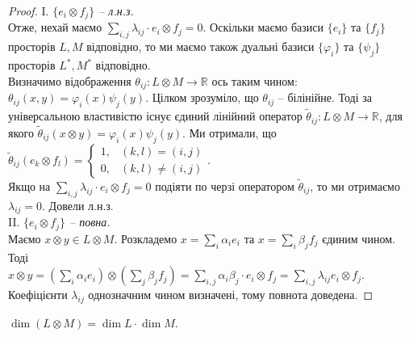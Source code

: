 \documentclass{math_library}
\begin{document}
\begin{proof}
I. \textit{$\{e_i \otimes f_j\}$ -- л.н.з.}\\
Отже, нехай маємо $\displaystyle\sum_{i,j} \lambda_{ij} \cdot e_i \otimes f_j = 0$. Оскільки маємо базиси $\{e_i\}$ та $\{f_j\}$ просторів $L,M$ відповідно, то ми маємо також дуальні базиси $\{\varphi_i\}$ та $\{\psi_j\}$ просторів $L^*,M^*$ відповідно.\\
Визначимо відображення $\theta_{ij} \colon L \otimes M \to \mathbb{R}$ ось таким чином: $\theta_{ij}(x,y) = \varphi_i(x) \psi_j(y)$. Цілком зрозуміло, що $\theta_{ij}$ -- білінійне. Тоді за універсальною властивістю існує єдиний лінійний оператор $\tilde{\theta}_{ij} \colon L \otimes M \to \mathbb{R}$, для якого $\tilde{\theta}_{ij}(x \otimes y) = \varphi_i(x) \psi_j(y)$. Ми отримали, що $\tilde{\theta}_{ij}(e_k \otimes f_l) = \begin{cases} 1, & (k,l) = (i,j) \\ 0, & (k,l) \neq (i,j) \end{cases}$.\\
Якщо на $\displaystyle\sum_{i,j} \lambda_{ij} \cdot e_i \otimes f_j = 0$ подіяти по черзі оператором $\tilde{\theta}_{ij}$, то ми отримаємо $\lambda_{ij} = 0$. Довели л.н.з.
\bigskip \\
II. \textit{$\{e_i \otimes f_j\}$ -- повна.}\\
Маємо $x \otimes y \in L \otimes M$. Розкладемо $x = \displaystyle\sum_i \alpha_i e_i$ та $x = \displaystyle\sum_i \beta_j f_j$ єдиним чином. Тоді\\
$x \otimes y = \displaystyle\left(\sum_i \alpha_i e_i \right) \otimes \left(\sum_j \beta_j f_j \right) = \sum_{i,j} \alpha_i \beta_j \cdot e_i \otimes f_j = \sum_{i,j} \lambda_{ij} e_i \otimes f_j$.\\
Коефіцієнти $\lambda_{ij}$ однозначним чином визначені, тому повнота доведена.
\end{proof}

\begin{corollary}
$\dim (L \otimes M) = \dim L \cdot \dim M$.
\end{corollary}
\end{document}
